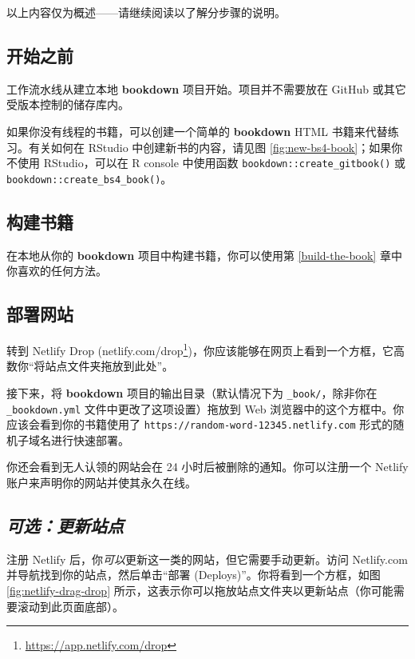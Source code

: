 \documentclass[
  12pt,
]{krantz}
\renewcommand{\href}[2]{#2\footnote{\url{#1}}}
\theoremstyle{definition}
\theoremstyle{definition}
\theoremstyle{definition}
\theoremstyle{definition}
\theoremstyle{remark}
\begin{document}
以上内容仅为概述------请继续阅读以了解分步骤的说明。

\subsection{开始之前}\label{ux5f00ux59cbux4e4bux524d}

工作流水线从建立本地 \textbf{bookdown} 项目开始。项目并不需要放在 GitHub 或其它受版本控制的储存库内。

如果你没有线程的书籍，可以创建一个简单的 \textbf{bookdown} HTML 书籍来代替练习。有关如何在 RStudio 中创建新书的内容，请见图 \ref{fig:new-bs4-book}；如果你不使用 RStudio，可以在 R console 中使用函数 \texttt{bookdown::create\_gitbook()} 或 \texttt{bookdown::create\_bs4\_book()}。

\subsection{构建书籍}\label{ux6784ux5efaux4e66ux7c4d}

在本地从你的 \textbf{bookdown} 项目中构建书籍，你可以使用第 \ref{build-the-book} 章中你喜欢的任何方法。

\subsection{部署网站}\label{ux90e8ux7f72ux7f51ux7ad9}

转到 Netlify Drop (\href{https://app.netlify.com/drop}{netlify.com/drop})，你应该能够在网页上看到一个方框，它高数你``将站点文件夹拖放到此处''。

接下来，将 \textbf{bookdown} 项目的输出目录（默认情况下为 \texttt{\_book/}，除非你在 \texttt{\_bookdown.yml} 文件中更改了这项设置）拖放到 Web 浏览器中的这个方框中。你应该会看到你的书籍使用了 \texttt{https://random-word-12345.netlify.com} 形式的随机子域名进行快速部署。

你还会看到无人认领的网站会在 24 小时后被删除的通知。你可以注册一个 Netlify 账户来声明你的网站并使其永久在线。

\subsection{\texorpdfstring{\emph{可选：更新站点}}{可选：更新站点}}\label{ux53efux9009ux66f4ux65b0ux7ad9ux70b9}

注册 Netlify 后，你\emph{可以}更新这一类的网站，但它需要手动更新。访问 Netlify.com 并导航找到你的站点，然后单击``部署 (Deploys)''。你将看到一个方框，如图 \ref{fig:netlify-drag-drop} 所示，这表示你可以拖放站点文件夹以更新站点（你可能需要滚动到此页面底部）。
\end{document}
